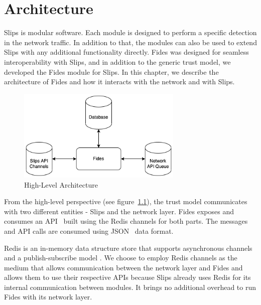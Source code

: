 \chapter{Architecture}
\label{ch:architecture}
Slips is modular software. Each module is designed to perform a specific detection in the network traffic.\cite{slips}
In addition to that, the modules can also be used to extend Slips with any additional functionality directly. 
Fides was designed for seamless interoperability with Slips, and in addition to the generic trust model, we developed the Fides module for Slips.
In this chapter, we describe the architecture of Fides and how it interacts with the network and with Slips.

\begin{figure}[ht]
    \centering
    \includegraphics[width=0.7\textwidth]{assets/high_architecture.png}
    \caption{High-Level Architecture}
    \label{fig:high-level-architecture}
\end{figure}

From the high-level perspective (see figure~\ref{fig:high-level-architecture}), the trust model communicates with two different entities - Slips and the network layer.
Fides exposes and consumes an API~\cite{api} built using the Redis channels for both parts.
The messages and API calls are consumed using JSON~\cite{json} data format.

Redis is an in-memory data structure store that supports asynchronous channels and a publish-subscribe model \cite{redis}.
We choose to employ Redis channels as the medium that allows communication between the network layer and Fides and allows them to use their respective APIs because Slips already uses Redis for its internal communication between modules. It brings no additional overhead to run Fides with its network layer.



